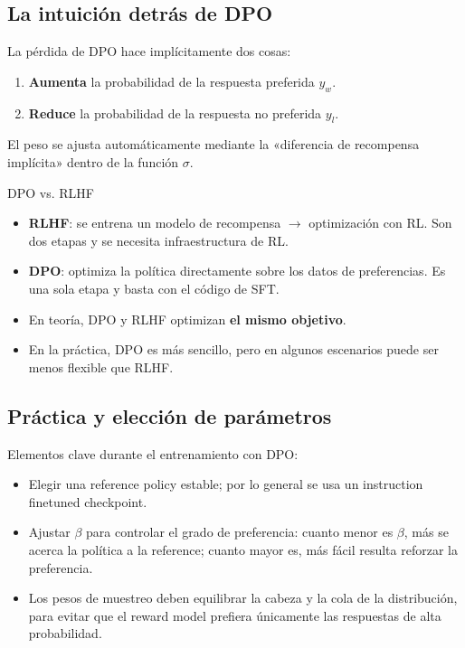 \documentclass[a4paper]{article}
\begin{document}
\subsection{La intuición detrás de DPO}

La pérdida de DPO hace implícitamente dos cosas:
\begin{enumerate}
    \item \textbf{Aumenta} la probabilidad de la respuesta preferida $y_w$.
    \item \textbf{Reduce} la probabilidad de la respuesta no preferida $y_l$.
\end{enumerate}

El peso se ajusta automáticamente mediante la «diferencia de recompensa implícita» dentro de la función $\sigma$.

\begin{knowledgebox}{DPO vs. RLHF}
\begin{itemize}
    \item \textbf{RLHF}: se entrena un modelo de recompensa $\to$ optimización con RL. Son dos etapas y se necesita infraestructura de RL.
    \item \textbf{DPO}: optimiza la política directamente sobre los datos de preferencias. Es una sola etapa y basta con el código de SFT.
    \item En teoría, DPO y RLHF optimizan \textbf{el mismo objetivo}.
    \item En la práctica, DPO es más sencillo, pero en algunos escenarios puede ser menos flexible que RLHF.
\end{itemize}
\end{knowledgebox}

\subsection{Práctica y elección de parámetros}

Elementos clave durante el entrenamiento con DPO:
\begin{itemize}
    \item Elegir una reference policy estable; por lo general se usa un instruction finetuned checkpoint.
    \item Ajustar $\beta$ para controlar el grado de preferencia: cuanto menor es $\beta$, más se acerca la política a la reference; cuanto mayor es, más fácil resulta reforzar la preferencia.
    \item Los pesos de muestreo deben equilibrar la cabeza y la cola de la distribución, para evitar que el reward model prefiera únicamente las respuestas de alta probabilidad.
\end{itemize}
\end{document}
